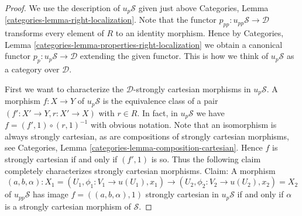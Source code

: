 \documentclass{stacks-project}
\theoremstyle{plain}
\theoremstyle{definition}
\theoremstyle{remark}
\numberwithin{equation}{subsection}
\begin{document}
\begin{proof}
We use the description of $u_p\mathcal{S}$ given just above
Categories, Lemma \ref{categories-lemma-right-localization}.
Note that the functor $p_{pp} : u_{pp}\mathcal{S} \to \mathcal{D}$
transforms every element of $R$ to an identity morphism.
Hence by
Categories, Lemma \ref{categories-lemma-properties-right-localization}
we obtain a canonical functor $p_p : u_p\mathcal{S} \to \mathcal{D}$
extending the given functor. This is how we think of
$u_p\mathcal{S}$ as a category over $\mathcal{D}$.

\medskip\noindent
First we want to characterize the $\mathcal{D}$-strongly cartesian morphisms
in $u_p\mathcal{S}$.
A morphism $f : X \to Y$ of $u_p\mathcal{S}$ is the equivalence class of
a pair $(f' : X' \to Y, r : X' \to X)$ with $r \in R$.
In fact, in $u_p\mathcal{S}$ we have $f = (f', 1) \circ (r, 1)^{-1}$
with obvious notation.
Note that an isomorphism is always strongly cartesian, as are
compositions of strongly cartesian morphisms, see
Categories, Lemma \ref{categories-lemma-composition-cartesian}.
Hence $f$ is strongly cartesian if and only if $(f', 1)$ is so.
Thus the following claim completely characterizes strongly cartesian
morphisms. Claim: A morphism
$$
(a, b, \alpha) :
X_1 = (U_1, \phi_1 : V_1 \to u(U_1), x_1)
\longrightarrow
(U_2, \phi_2 : V_2 \to u(U_2), x_2) = X_2
$$
of $u_{pp}\mathcal{S}$ has image $f = ((a, b, \alpha), 1)$
strongly cartesian in $u_p\mathcal{S}$ if and only if $\alpha$
is a strongly cartesian morphism of $\mathcal{S}$.


\end{proof}
\end{document}
